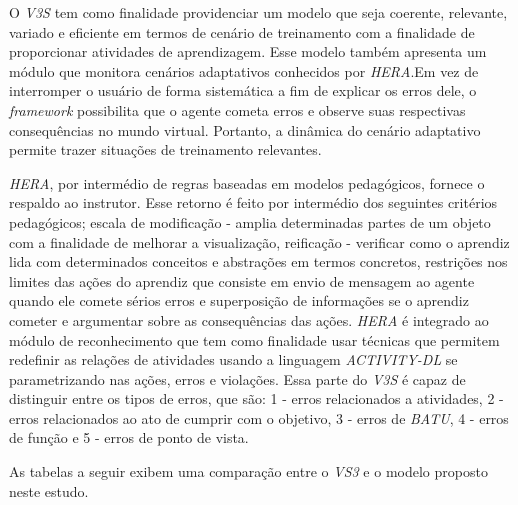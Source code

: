 O \textit{V3S} tem como finalidade providenciar um modelo que seja coerente, relevante, variado e eficiente em termos de cenário de treinamento com a finalidade de proporcionar atividades de aprendizagem. Esse modelo também apresenta um módulo que monitora cenários adaptativos conhecidos por \textit{HERA}.Em vez de interromper o usuário de forma sistemática a fim de explicar os erros dele, o \textit{framework} possibilita que o agente cometa erros e observe suas respectivas consequências no mundo virtual. Portanto, a dinâmica do cenário adaptativo permite trazer situações de treinamento relevantes. 

\textit{HERA}, por intermédio de regras baseadas em modelos pedagógicos, fornece o respaldo ao instrutor. Esse retorno é feito por intermédio dos seguintes critérios pedagógicos; escala de modificação - amplia determinadas partes de um objeto com a finalidade de melhorar a visualização, reificação - verificar como o aprendiz lida com determinados conceitos e abstrações em termos concretos, restrições nos limites das ações do aprendiz que consiste em envio de mensagem ao agente quando ele comete sérios erros e superposição de informações se o aprendiz cometer e argumentar sobre as consequências das ações. \textit{HERA} é integrado ao módulo de reconhecimento que tem como finalidade usar técnicas que permitem redefinir as relações de atividades usando a linguagem \textit{ACTIVITY-DL} se parametrizando nas ações, erros e violações. Essa parte do \textit{V3S} é capaz de distinguir entre os tipos de erros, que são: 1 - erros relacionados a atividades, 2 - erros relacionados ao ato de cumprir com o objetivo, 3 - erros de \textit{BATU}, 4 - erros de função e 5 - erros de ponto de vista.

As tabelas a seguir exibem uma comparação entre o \textit{VS3} e o modelo proposto neste estudo.

